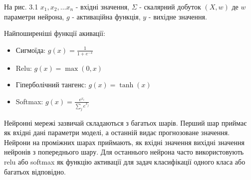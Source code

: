 На рис. 3.1 $x_1, x_2, \dots x_n$ - вхідні значення, $\Sigma$ - скалярний добуток $(X, w)$ де $w$ параметри нейрона, $g$ - активаційна функція, $y$ - вихідне значення. 

Найпоширеніші функції акивації:

\begin{itemize}
    \item Сигмоїда: $g(x) = \frac{1}{1 + e^{-x}}$
    \item Relu: $g(x) = \max(0, x)$
    \item Гіперболічний тангенс: $g(x) = \tanh(x)$
    \item Softmax: $g(x) = \frac{e^{x_i}}{\sum_{j} e^{x_j}}$
\end{itemize}

Нейронні мережі зазвичай складаються з багатьох шарів. 
Перший шар приймає як вхідні дані параметри моделі, а останній видає прогнозоване значення. 
Нейрони на проміжних шарах приймають, як вхідні значення вихідні значення нейронів з попереднього шару. 
Для останнього нейрона часто використовують relu або softmax як функцію активації для задач класифікації одного класа або багатьох відповідно.


